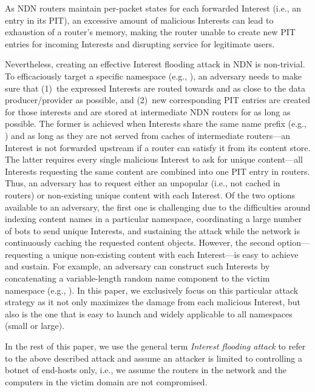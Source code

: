 As NDN routers maintain per-packet states for each forwarded Interest (i.e., an entry in its PIT), an excessive amount of malicious Interests can lead to exhaustion of a router's memory, making the router unable to create new PIT entries for incoming Interests and disrupting service for legitimate users.

Nevertheless, creating an effective Interest flooding attack in NDN is non-trivial.
To efficaciously target a specific namespace (e.g., ), an adversary needs to make sure that (1)~the expressed Interests are routed towards and as close to the data producer/provider as possible, and (2)~new corresponding PIT entries are created for those interests and are stored at intermediate NDN routers for as long as possible. The former is achieved when Interests share the same name prefix (e.g., ) and as long as they are not served from caches of intermediate routers---an Interest is not forwarded upstream if a router can satisfy it from its content store. The latter requires every single malicious Interest to ask for unique content---all Interests requesting the same content are combined into one PIT entry in routers. Thus, an adversary has to request either an unpopular (i.e., not cached in routers) or non-existing unique content with each Interest. Of the two options available to an adversary, the first one is challenging due to the difficulties around indexing content names in a particular namespace, coordinating a large number of bots to send unique Interests, and sustaining the attack while the network is continuously caching the requested content objects. However, the second option---requesting a unique non-existing content with each Interest---is easy to achieve and sustain. For example, an adversary can construct such Interests by concatenating a variable-length random name component to the victim namespace (e.g., ). In this paper, we exclusively focus on this particular attack strategy as it not only maximizes the damage from each malicious Interest, but also is the one that is easy to launch and widely applicable to all namespaces (small or large). %

In the rest of this paper, we use the general term \emph{Interest flooding attack} to refer to the above described attack and assume an attacker is limited to controlling a botnet of end-hosts only, i.e., we assume the routers in the network and the computers in the victim domain are not compromised.

